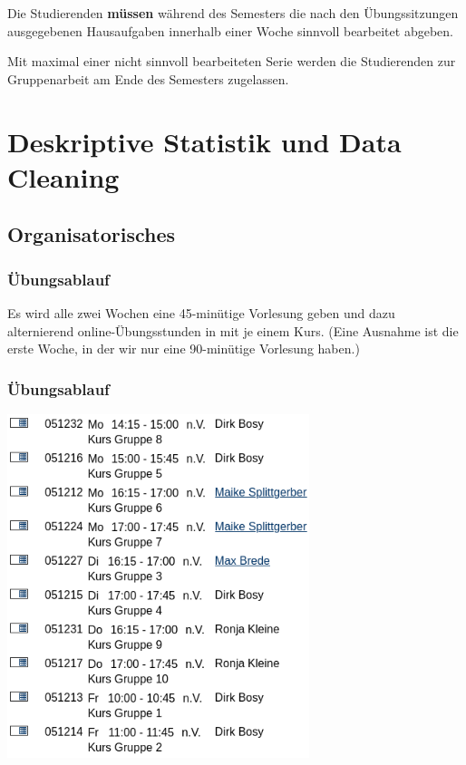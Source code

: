 \documentclass[
]{book}
\begin{document}
Die Studierenden \textbf{müssen} während des Semesters die nach den Übungssitzungen ausgegebenen Hausaufgaben innerhalb einer Woche sinnvoll bearbeitet abgeben.

Mit maximal einer nicht sinnvoll bearbeiteten Serie werden die Studierenden zur Gruppenarbeit am Ende des Semesters zugelassen.

\hypertarget{deskriptive-statistik-und-data-cleaning}{%
\chapter{Deskriptive Statistik und Data Cleaning}\label{deskriptive-statistik-und-data-cleaning}}

\hypertarget{organisatorisches}{%
\section{Organisatorisches}\label{organisatorisches}}

\hypertarget{uxfcbungsablauf}{%
\subsection{Übungsablauf}\label{uxfcbungsablauf}}

Es wird alle zwei Wochen eine 45-minütige Vorlesung geben und dazu alternierend online-Übungsstunden in mit je einem Kurs. (Eine Ausnahme ist die erste Woche, in der wir nur eine 90-minütige Vorlesung haben.)

\hypertarget{uxfcbungsablauf-1}{%
\subsection{Übungsablauf}\label{uxfcbungsablauf-1}}

\begin{center}\includegraphics[width=250pt]{imgs/univis} \end{center}
\end{document}
